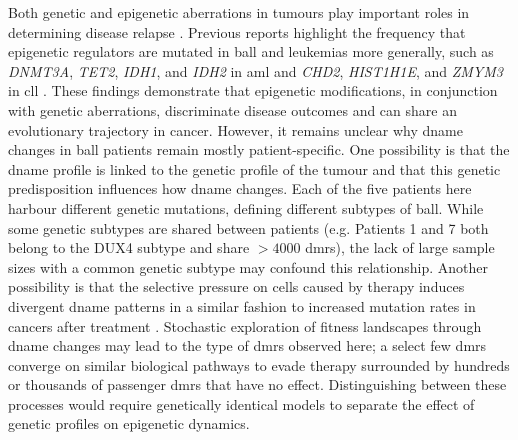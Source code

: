 Both genetic and epigenetic aberrations in tumours play important roles in determining disease relapse \cite{nordlundGenomewideSignaturesDifferential2013,leeEpigeneticRemodelingBcell2015}.
Previous reports highlight the frequency that epigenetic regulators are mutated in \gls{ball} \cite{maRiseFallSubclones2015} and leukemias more generally, such as \emph{DNMT3A}, \emph{TET2}, \emph{IDH1}, and \emph{IDH2} in \gls{aml} \cite{kishtagariDriverMutationsAcute2020,papaemmanuilGenomicClassificationPrognosis2016,leyDNMT3AMutationsAcute2010} and \emph{CHD2}, \emph{HIST1H1E}, and \emph{ZMYM3} in \gls{cll} \cite{billotDeregulationAiolosExpression2011,landauChronicLymphocyticLeukemia2013,landauEvolutionImpactSubclonal2013}.
These findings demonstrate that epigenetic modifications, in conjunction with genetic aberrations, discriminate disease outcomes and can share an evolutionary trajectory in cancer.
However, it remains unclear why \gls{dname} changes in \gls{ball} patients remain mostly patient-specific.
One possibility is that the \gls{dname} profile is linked to the genetic profile of the tumour and that this genetic predisposition influences how \gls{dname} changes.
Each of the five patients here harbour different genetic mutations, defining different subtypes of \gls{ball}.
While some genetic subtypes are shared between patients (e.g. Patients 1 and 7 both belong to the DUX4 subtype and share $> 4000$ \glspl{dmr}), the lack of large sample sizes with a common genetic subtype may confound this relationship.
Another possibility is that the selective pressure on cells caused by therapy induces divergent \gls{dname} patterns in a similar fashion to increased mutation rates in cancers after treatment \cite{russoAdaptiveMutabilityColorectal2019}.
Stochastic exploration of fitness landscapes through \gls{dname} changes may lead to the type of \glspl{dmr} observed here; a select few \glspl{dmr} converge on similar biological pathways to evade therapy surrounded by hundreds or thousands of passenger \glspl{dmr} that have no effect.
Distinguishing between these processes would require genetically identical models to separate the effect of genetic profiles on epigenetic dynamics.


